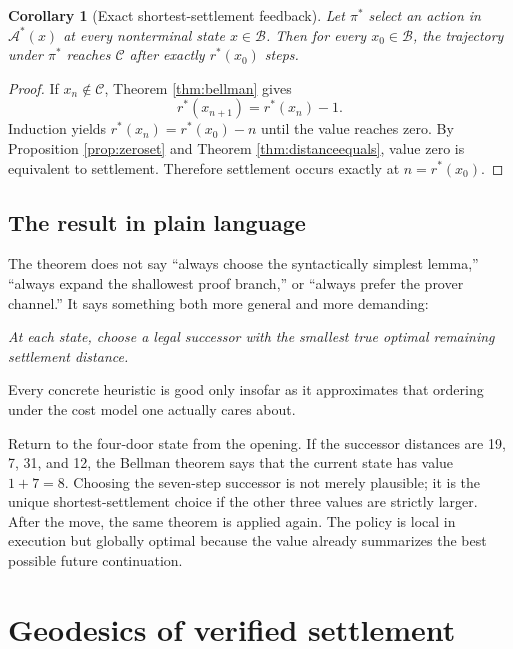 \documentclass[11pt,letterpaper]{article}
\newtheorem{corollary}[theorem]{Corollary}
\theoremstyle{remark}
\newcommand{\Cset}{\mathcal C}
\newcommand{\Basin}{\mathcal B}
\newcommand{\A}{\mathcal A}
\newcommand{\rstar}{r^{\!*}}
\begin{document}
\begin{corollary}[Exact shortest-settlement feedback]\label{cor:policy}
Let $\pi^*$ select an action in $\A^*(x)$ at every nonterminal state $x\in\Basin$. Then for every $x_0\in\Basin$, the trajectory under $\pi^*$ reaches $\Cset$ after exactly $\rstar(x_0)$ steps.
\end{corollary}

\begin{proof}
If $x_n\notin\Cset$, Theorem \ref{thm:bellman} gives
\[
\rstar(x_{n+1})=\rstar(x_n)-1.
\]
Induction yields $\rstar(x_n)=\rstar(x_0)-n$ until the value reaches zero. By Proposition \ref{prop:zeroset} and Theorem \ref{thm:distanceequals}, value zero is equivalent to settlement. Therefore settlement occurs exactly at $n=\rstar(x_0)$.
\end{proof}

\subsection{The result in plain language}

The theorem does not say ``always choose the syntactically simplest lemma,'' ``always expand the shallowest proof branch,'' or ``always prefer the prover channel.'' It says something both more general and more demanding:

\begin{center}
\emph{At each state, choose a legal successor with the smallest true optimal remaining settlement distance.}
\end{center}

Every concrete heuristic is good only insofar as it approximates that ordering under the cost model one actually cares about.

\begin{storybox}
Return to the four-door state from the opening. If the successor distances are 19, 7, 31, and 12, the Bellman theorem says that the current state has value $1+7=8$. Choosing the seven-step successor is not merely plausible; it is the unique shortest-settlement choice if the other three values are strictly larger. After the move, the same theorem is applied again. The policy is local in execution but globally optimal because the value already summarizes the best possible future continuation.
\end{storybox}

\section{Geodesics of verified settlement}\label{sec:geodesics}
\end{document}
